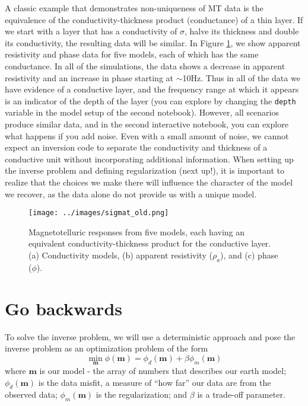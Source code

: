 \documentclass[11pt,oneside]{article}
\begin{document}
A classic example that demonstrates non-uniqueness of MT data is the equivalence of the   conductivity-thickness product (conductance) of a thin layer. If we start with a layer that has a conductivity of $\sigma$, halve its thickness and double its conductivity, the resulting data will be similar. In Figure \ref{fig:sigmat}, we show apparent resistivity and phase data for five models, each of which has the same conductance. In all of the simulations, the data shows a decrease in apparent resistivity and an increase in phase starting at $\sim$10Hz. Thus in all of the data we have evidence of a conductive layer, and the frequency range at which it appears is an indicator of the depth of the layer (you can explore by changing the \texttt{depth} variable in the model setup of the second notebook). However, all scenarios produce similar data, and in the second interactive notebook, you can explore what happens if you add noise. Even with a small amount of noise, we cannot expect an inversion code to separate the conductivity and thickness of a conductive unit without incorporating additional information. When setting up the inverse problem and defining regularization (next up!), it is important to realize that the choices we make there will influence the character of the model we recover, as the data alone do not provide us with a unique model.

\begin{figure}[htb!]
    \centering
    \texttt{[image: ../images/sigmat\_old.png]}
\caption{Magnetotelluric responses from five models, each having an equivalent conductivity-thickness product for the conductive layer. (a) Conductivity models, (b) apparent resistivity ($\rho_a$), and (c) phase ($\phi$).}
\label{fig:sigmat}
\end{figure}

\section{Go backwards}

To solve the inverse problem, we will use a deterministic approach and pose the inverse problem as an optimization problem of the form
\begin{equation}
\min_{\mathbf{m}} \phi(\mathbf{m}) = \phi_d(\mathbf{m}) + \beta\phi_m(\mathbf{m})
\end{equation}
where $\mathbf{m}$ is our model - the array of numbers that describes our earth model; $\phi_d(\mathbf{m})$ is the data misfit, a measure of ``how far'' our data are from the observed data; $\phi_m(\mathbf{m})$ is the regularization; and $\beta$ is a trade-off parameter.
\end{document}
